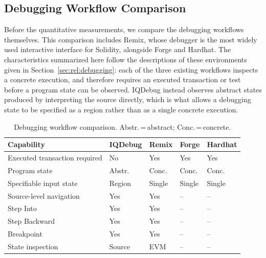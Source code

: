 \documentclass[11pt,oneside]{report}
\theoremstyle{plain}
\theoremstyle{definition}
\theoremstyle{remark}
\begin{document}
\subsection{Debugging Workflow Comparison}
\label{subsec:eval:rq1:workflow}

Before the quantitative measurements, we compare the debugging workflows themselves. This comparison includes Remix, whose debugger is the most widely used interactive interface for Solidity, alongside Forge and Hardhat. The characteristics summarized here follow the descriptions of these environments given in Section~\ref{sec:rel:debugging}: each of the three existing workflows inspects a concrete execution, and therefore requires an executed transaction or test before a program state can be observed. IQDebug instead observes abstract states produced by interpreting the source directly, which is what allows a debugging state to be specified as a region rather than as a single concrete execution.

\begin{table}[t]
\centering
\caption{Debugging workflow comparison. Abstr.\,=\,abstract;
Conc.\,=\,concrete.}
\label{tab:eval:rq1-workflow}
\footnotesize
\begin{tabularx}{\linewidth}{@{} >{\raggedright\arraybackslash}X
                                 l l l l @{}}
\toprule
\textbf{Capability} & \textbf{IQDebug} & \textbf{Remix} & \textbf{Forge} &
\textbf{Hardhat} \\
\midrule
Executed transaction required & No      & Yes    & Yes   & Yes   \\
Program state                 & Abstr.  & Conc.  & Conc. & Conc. \\
Specifiable input state       & Region  & Single & Single & Single \\
\midrule
Source-level navigation       & Yes     & Yes    & --    & --    \\
Step Into                     & Yes     & Yes    & --    & --    \\
Step Backward                 & Yes     & Yes    & --    & --    \\
Breakpoint                    & Yes     & Yes    & --    & --    \\
State inspection              & Source  & EVM    & --    & --    \\
\bottomrule
\end{tabularx}
\end{table}
\end{document}
